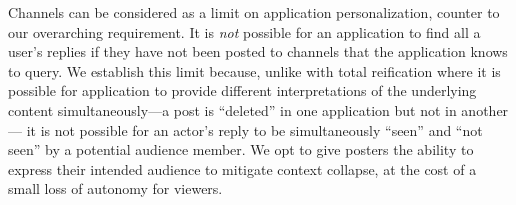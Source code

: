 Channels can be considered as a limit on application personalization,
counter to our overarching requirement.
It is \emph{not} possible for an
application to find all a user's replies if they have not been posted to channels that
the application knows to query.
We establish this limit because, unlike with total reification where it is
possible for application to provide different interpretations of the underlying
content simultaneously---a post is ``deleted'' in one application but not in another---%
it is not possible for an actor's reply to be simultaneously ``seen'' and ``not seen''
by a potential audience member.
We opt to give posters the ability to express their intended audience
to mitigate context collapse, at the cost of a small loss of autonomy for viewers.








